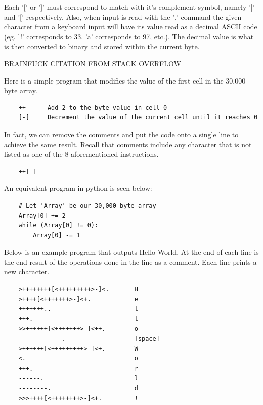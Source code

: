 Each '[' or ']' must correspond to match with it's complement symbol, namely ']' and '[' respectively.
Also, when input is read with the ',' command the given character from a keyboard input will have its value read as a decimal ASCII code
(eg. '!' corresponds to 33. 'a' corresponds to 97, etc.).
The decimal value is what is then converted to binary and stored within the current byte.

\href{https://stackoverflow.com/questions/16836860/how-does-the-brainfuck-hello-world-actually-work/19869651#19869651}{BRAINFUCK CITATION FROM STACK OVERFLOW}

Here is a simple program that modifies the value of the first cell in the 30,000 byte array.

\begin{verbatim}
    ++      Add 2 to the byte value in cell 0
    [-]     Decrement the value of the current cell until it reaches 0
\end{verbatim}

In fact, we can remove the comments and put the code onto a single line to achieve the same result.
Recall that comments include any character that is not listed as one of the 8 aforementioned instructions.

\begin{verbatim}
    ++[-]
\end{verbatim}

An equivalent program in python is seen below:

\begin{verbatim}
    # Let 'Array' be our 30,000 byte array
    Array[0] += 2
    while (Array[0] != 0):
        Array[0] -= 1
\end{verbatim}

Below is an example program that outputs Hello World.
At the end of each line is the end result of the operations done in the line as a comment.
Each line prints a new character.

\begin{verbatim}
    >++++++++[<+++++++++>-]<.       H
    >++++[<+++++++>-]<+.            e
    +++++++..                       l
    +++.                            l
    >>++++++[<+++++++>-]<++.        o
    ------------.                   [space]
    >++++++[<+++++++++>-]<+.        W
    <.                              o
    +++.                            r
    ------.                         l
    --------.                       d
    >>>++++[<++++++++>-]<+.         !
\end{verbatim}


